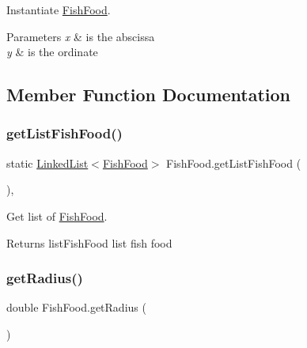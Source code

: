 Instantiate \mbox{\hyperlink{class_fish_food}{Fish\+Food}}.


\begin{DoxyParams}{Parameters}
{\em x} & is the abscissa \\
\hline
{\em y} & is the ordinate \\
\hline
\end{DoxyParams}


\subsection{Member Function Documentation}
\mbox{\label{class_fish_food_aa35d784e5f8c59d1029fcb119eaf302b}} 
\subsubsection{\texorpdfstring{get\+List\+Fish\+Food()}{getListFishFood()}}
{\footnotesize\ttfamily static \mbox{\hyperlink{class_linked_list}{Linked\+List}}$<$\mbox{\hyperlink{class_fish_food}{Fish\+Food}}$>$ Fish\+Food.\+get\+List\+Fish\+Food (\begin{DoxyParamCaption}{ }\end{DoxyParamCaption})\hspace{0.3cm}{\ttfamily [inline]}, {\ttfamily [static]}}

Get list of \mbox{\hyperlink{class_fish_food}{Fish\+Food}}.

\begin{DoxyReturn}{Returns}
list\+Fish\+Food list fish food 
\end{DoxyReturn}
\mbox{\label{class_fish_food_a2b498cda505d338c12ef59f7d4746325}} 
\subsubsection{\texorpdfstring{get\+Radius()}{getRadius()}}
{\footnotesize\ttfamily double Fish\+Food.\+get\+Radius (\begin{DoxyParamCaption}{ }\end{DoxyParamCaption})\hspace{0.3cm}{\ttfamily [inline]}}

